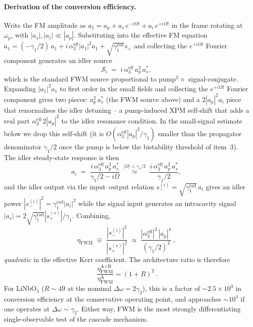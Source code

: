\documentclass[11pt,a4paper]{article}
\newcommand{\Dom}{\Delta\omega}
\begin{document}
\paragraph*{Derivation of the conversion efficiency.}
Write the FM amplitude as $a_1=a_p+a_s\,e^{-i\Omega t}+a_i\,e^{+i\Omega t}$
in the frame rotating at $\omega_p$, with $|a_s|,|a_i|\ll|a_p|$.
Substituting into the effective FM equation
$\dot a_1 = (-\gamma_1/2)\,a_1+i\,\alpha_3^\text{eff}|a_1|^{2}a_1
+\sqrt{\gamma_1^\text{rad}}s_+$ and collecting the $e^{+i\Omega t}$
Fourier component generates an idler source
\begin{equation*}
  \mathcal{S}_i\;=\;i\,\alpha_3^\text{eff}\,a_p^{2}\,a_s^{*},
\end{equation*}
which is the standard FWM source proportional to pump${}^{2}\times$
signal-conjugate.  Expanding $|a_1|^{2}a_1$ to first order in the
small fields and collecting the $e^{+i\Omega t}$ Fourier component
gives two pieces: $a_p^{2}\,a_s^{*}$ (the FWM source above) and a
$2|a_p|^{2}a_i$ piece that renormalises the idler detuning -- a
pump-induced XPM self-shift that adds a real part
$\alpha_3^\text{eff}\,2|a_p|^{2}$ to the idler resonance condition.
In the small-signal estimate below we drop this self-shift (it is
$O(\alpha_3^\text{eff}|a_p|^2/\gamma_1)$ smaller than the propagator
denominator $\gamma_1/2$ once the pump is below the bistability
threshold of item~3).  The idler steady-state response is then
\begin{equation*}
  a_i \;=\; \frac{i\,\alpha_3^\text{eff}\,a_p^{2}\,a_s^{*}}{\gamma_1/2-i\Omega}
       \;\stackrel{|\Omega|<\gamma_1/2}{\simeq}\;
       \frac{i\,\alpha_3^\text{eff}\,a_p^{2}\,a_s^{*}}{\gamma_1/2},
\end{equation*}
and the idler output via the input--output relation
$s_-^{(i)}=\sqrt{\gamma_1^\text{rad}}\,a_i$ gives an idler power
$|s_-^{(i)}|^{2}=\gamma_1^\text{rad}|a_i|^{2}$ while the signal input
generates an intracavity signal
$|a_s|=2\sqrt{\gamma_1^\text{rad}}|s_+^{(s)}|/\gamma_1$.  Combining,
\begin{equation}
  \eta_\text{FWM}\;\equiv\;\frac{|s_-^{(i)}|^{2}}{|s_+^{(s)}|^{2}}
  \;\propto\;\frac{|\alpha_3^\text{eff}|^{2}\,|a_p|^{4}}{(\gamma_1/2)^{2}}\,,
  \label{eq:eta-FWM}
\end{equation}
\emph{quadratic} in the effective Kerr coefficient.  The architecture
ratio is therefore
\begin{equation}
  \boxed{\;\frac{\eta_\text{FWM}^{\text{A+B}}}{\eta_\text{FWM}^{\text{A}}}=(1+R)^{2}\;.}
\end{equation}
For LiNbO$_3$ ($R\sim 49$ at the nominal $\Dom=2\gamma_2$), this is a
factor of $\sim 2.5\times10^{3}$ in conversion efficiency at the
conservative operating point, and approaches $\sim 10^{4}$ if one
operates at $\Dom\sim\gamma_2$.  Either way, FWM is the most strongly
differentiating single-observable test of the cascade mechanism.
\end{document}
